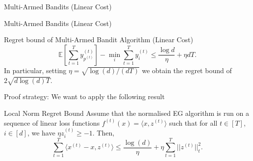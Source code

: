 \begin{frame}{Multi-Armed Bandits (Linear Cost)}
\small
\begin{center}
\end{center}
\end{frame}

\begin{frame}{Multi-Armed Bandits (Linear Cost)}
    \small
    \begin{block}{Regret bound of Multi-Armed Bandit Algorithm (Linear Cost)}
        $$
        \mathbb{E}\left[\sum_{t=1}^{T} y^{(t)}_{p^{(t)}}\right] - \min_i \sum_{t=1}^{T} y^{(t)}_i
        \leq \frac{\log d}{\eta} + \eta d T.
        $$
        In particular, setting $\eta = \sqrt{\log(d)/(dT)}$ we obtain the regret bound of
        $2\sqrt{d \log(d) T}$.
    \end{block}\pause
    Proof strategy: We want to apply the following result
    \begin{block}{Local Norm Regret Bound}
        Assume that the normalised EG algorithm is run on a sequence of linear loss functions $f^{(t)}(x) = \langle x, z^{(t)} \rangle$ such that for all $t \in [T]$, $i \in [d]$, we have $\eta z^{(t)}_i \geq -1$. Then,
        $$
        \sum_{t=1}^T \langle x^{(t)} - x, z^{(t)} \rangle
        \leq \frac{\log(d)}{\eta} + \eta \sum_{t=1}^T ||z^{(t)}||^2_t.
        $$
    \end{block}
\end{frame}

